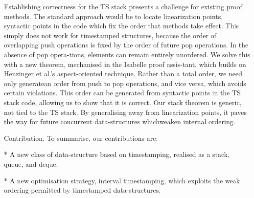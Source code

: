 Establishing correctness for the TS stack presents a challenge for existing
proof methods. 
The standard approach would be to locate linearization points, syntactic points
in the code which fix the order that methods take effect. 
This simply does not work for timestamped structures, because the order of
overlapping push operations is fixed by the order of future pop operations.
In the absence of pop opera-tions, elements can remain entirely unordered. 
We solve this with a new theorem, mechanised in the Isabelle proof assis-tant,
which builds on Henzinger et al.'s aspect-oriented technique. 
Rather than a total order, we need only generatean order from push to pop
operations, and vice versa, which avoids certain violations. 
This order can be generated from syntactic points in the TS stack code, allowing
us to show that it is correct. 
Our stack theorem is generic, not tied to the TS stack. 
By generalising away from linearization points, it paves the way for future
concurrent data-structures whichweaken internal ordering.

Contribution. To summarise, our contributions are:

* A new class of data-structure based on timestamping, realised as a stack,
queue, and deque.

* A new optimisation strategy, interval timestamping, which exploits the weak
ordering permitted by timestamped data-structures.

